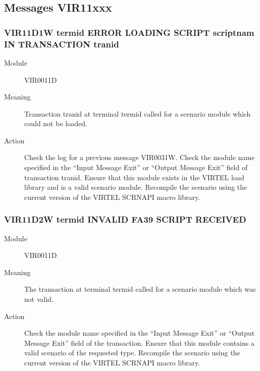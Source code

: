 \documentclass[letterpaper,10pt,english]{sphinxmanual}
\begin{document}
\subsection{Messages VIR11xxx}
\label{\detokenize{messages:messages-vir11xxx}}

\subsubsection{VIR11D1W termid ERROR LOADING SCRIPT scriptnam IN TRANSACTION tranid}
\label{\detokenize{messages:vir11d1w-termid-error-loading-script-scriptnam-in-transaction-tranid}}\begin{description}
\item[{Module}] \leavevmode
VIR0011D

\item[{Meaning}] \leavevmode
Transaction tranid at terminal termid called for a scenario module which could not be loaded.

\item[{Action}] \leavevmode
Check the log for a previous message VIR0031W. Check the module name specified in the “Input Message Exit” or “Output Message Exit” field of transaction tranid. Ensure that this module exists in the VIRTEL load library and is a valid scenario module. Recompile the scenario using the current version of the VIRTEL SCRNAPI macro library.

\end{description}


\subsubsection{VIR11D2W termid INVALID FA39 SCRIPT RECEIVED}
\label{\detokenize{messages:vir11d2w-termid-invalid-fa39-script-received}}\begin{description}
\item[{Module}] \leavevmode
VIR0011D

\item[{Meaning}] \leavevmode
The transaction at terminal termid called for a scenario module which was not valid.

\item[{Action}] \leavevmode
Check the module name specified in the “Input Message Exit” or “Output Message Exit” field of the transaction. Ensure that this module contains a valid scenario of the requested type. Recompile the scenario using the current version of the VIRTEL SCRNAPI macro library.

\end{description}
\end{document}
